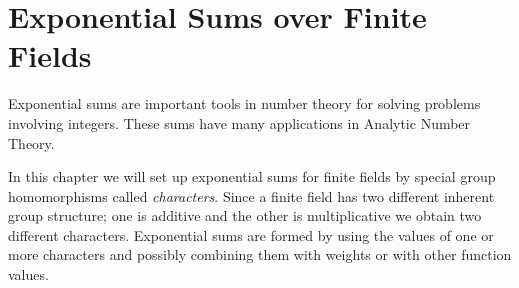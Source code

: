\chapter{Exponential Sums over Finite Fields}
Exponential sums are important tools in number theory for solving problems involving integers. These sums have many applications in Analytic Number Theory. 

In this chapter we will set up exponential sums for finite fields by special group homomorphisms called \emph{characters}. Since a finite field has two different inherent group structure; one is additive and the other is multiplicative we obtain two different characters. Exponential sums are formed by using the values of one or more characters and possibly combining them with weights or with other function values.










